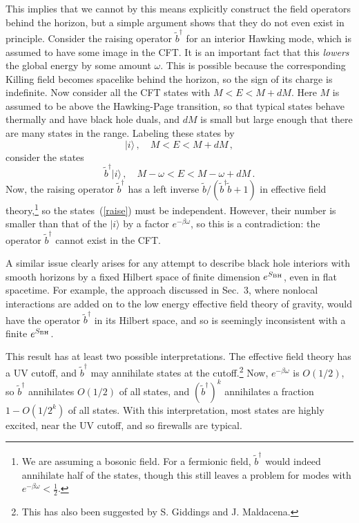 \documentclass[12pt]{article}
\newcommand{\be}{\begin{equation}}
\newcommand{\ee}{\end{equation}}
\begin{document}
{{This implies that we cannot by this means explicitly construct  the field operators behind the horizon, but a simple argument shows that they do not even exist in principle.  Consider the raising operator $\tilde b^\dagger$ for an interior Hawking mode, which is assumed to have some image in the CFT.  It is an important fact that this {\it lowers} the global energy by some amount $\omega$.  This is possible because the corresponding Killing field becomes spacelike behind the horizon, so the sign of its charge is indefinite.  Now consider all the CFT states with $M < E < M + dM$.   Here $M$ is assumed to be above the Hawking-Page transition, so that typical states behave thermally and have black hole duals, and $dM$ is small but large enough that there are many states in the range.  Labeling these states by
\be
|i\rangle\,, \quad  M < E < M + dM \,,
\ee
consider the states
\be
\tilde b^\dagger |i\rangle \,,  \quad  M - \omega < E < M - \omega + dM \label{raise} \,.
\ee
Now, the raising operator $\tilde b^\dagger$ has a left inverse $\tilde b/(\tilde b^\dagger \tilde b + 1)$ in effective field theory,\footnote{{We are assuming a bosonic field.  For a fermionic field, $\tilde b^\dagger$ would indeed annihilate half of the states, though this still leaves a problem for modes with $e^{-\beta\omega} < \frac{1}{2}$.}}
so the states~(\ref{raise}) must be independent.  However, their number is smaller than that of the $|i\rangle$ by a factor $e^{-\beta\omega}$, so this is a contradiction: the operator $\tilde b^\dagger$ cannot exist in the CFT.

A similar issue clearly arises for any attempt to describe black hole interiors with smooth horizons by a fixed Hilbert space of finite dimension $e^{S_{\rm BH}}$, even in flat spacetime.  For example, the approach discussed in Sec.~3, where nonlocal interactions are added on to the low energy effective field theory of gravity, would have the operator $\tilde b^\dagger$ in its Hilbert space, and so is seemingly inconsistent with a finite $e^{S_{\rm BH}}$.

This result has at least two possible interpretations.  The effective field theory has a UV cutoff, and $\tilde b^\dagger$ may annihilate states at the cutoff.\footnote{This has also been suggested by S. Giddings and J. Maldacena.}  Now, $e^{-\beta\omega}$ is $O(1/2)$, so $\tilde b^\dagger$ annihilates $O(1/2)$ of all states, and $(\tilde b^\dagger)^k$ annihilates {a fraction $1 - O(1/2^k)$} of all states.  With this interpretation, most states are highly excited, near the UV cutoff, and so firewalls are typical.

}}
\end{document}
